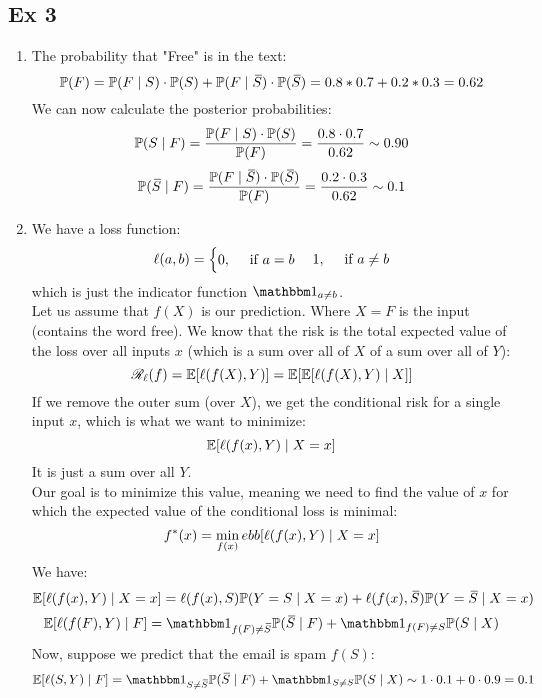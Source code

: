 \documentclass[12pt]{article}
\begin{document}
\newpage

\subsection*{Ex 3}

\begin{enumerate}[label=\letters]
    \item 
    The probability that "Free" is in the text:
    \[\mathbb{P}(F) = \mathbb{P}(F \mid S) \cdot \mathbb{P}(S)
    +  \mathbb{P}(F \mid \,\overline{\!{S}}) \cdot \mathbb{P}(\,\overline{\!{S}})
    = 0.8 * 0.7 + 0.2 * 0.3 = 0.62 \]
    We can now calculate the posterior
    probabilities:
    \[ \mathbb{P}(S \mid F)
    = \dfrac{\mathbb{P}(F \mid S) \cdot \mathbb{P}(S)}{\mathbb{P}(F)}
    = \dfrac{0.8 \cdot 0.7}{0.62}
    \sim 0.90 \]
    \[ \mathbb{P}(\,\overline{\!{S}} \mid F)
    = \dfrac{\mathbb{P}(F \mid \,\overline{\!{S}}) \cdot \mathbb{P}(\,\overline{\!{S}})}
    {\mathbb{P}(F)}
    = \dfrac{0.2 \cdot 0.3}{0.62}
    \sim 0.1 \]
    \item 
    We have a loss function:
    \[ \ell(a, b)
    = \begin{cases} 0, \quad \text{ if $a = b$} \end{cases}
    {1, \quad \text{ if $a \neq b$}} \]
    which is just the indicator function
    $\indicator_{a \neq b}$. \\ 
    Let us assume that $f(X)$
    is our prediction.
    Where $X = F$ is the input (contains
    the word free).
    We know that the risk is the total
    expected value of the loss over
    all inputs $x$
    (which is a sum over all of $X$
    of a sum over all of $Y$):
    \[ \mathscr{R}_\ell(f) = \mathbb{E}[\ell(f(X), Y)]
    = \mathbb{E}[\mathbb{E}[\ell(f(X), Y) \mid X]] \]
    If we remove the outer sum (over $X$),
    we get the conditional risk for a 
    single input $x$, which is
    what we want to minimize:
    \[ \mathbb{E}[\ell(f(x), Y) \mid X = x] \]
    It is just a sum over all $Y$. \\
    Our goal is to minimize this value,
    meaning we need to find the value of $x$
    for which the expected value 
    of the conditional loss is minimal:
    \[ f^*(x) = \min_{f(x)} \\ebb[\ell(f(x), Y) \mid X = x]  \]
    We have:
    \[ \mathbb{E}[\ell(f(x), Y) \mid X = x]
    = \ell(f(x), S)\mathbb{P}(Y = S \mid X = x)
    + \ell(f(x), \,\overline{\!{S}})\mathbb{P}(Y = \,\overline{\!{S}} \mid X = x) \]
    \[ \ebb[\ell(f(F), Y) \mid F]
    = \indicator_{f(F) \neq \olsi{S}}
    \pbb(\olsi{S} \mid F) +
    \indicator_{f(F) \neq S}
    \pbb(S \mid X)  \]
    Now, suppose we predict that
    the email is spam $f(S)$:
    \[ \ebb[\ell(S, Y) \mid F]
    = \indicator_{S \neq \olsi{S}}
    \pbb(\olsi{S} \mid F) +
    \indicator_{S \neq S}
    \pbb(S \mid X) 
    \sim 1 \cdot 0.1 + 0 \cdot 0.9 = 0.1 \]

\end{enumerate}
\end{document}
